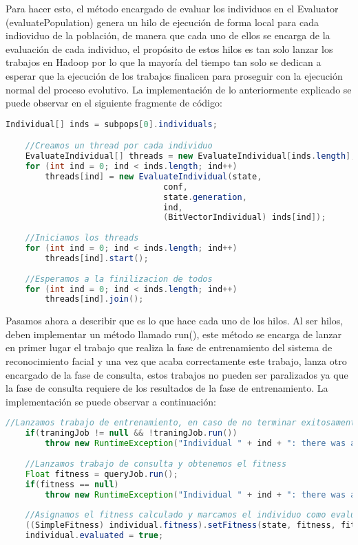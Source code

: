 Para hacer esto, el método encargado de evaluar los individuos en el Evaluator (evaluatePopulation) genera un hilo de ejecución de forma local para cada indioviduo de la poblaci\'on, de manera que cada uno de ellos se encarga de la evaluación de cada individuo, el propósito de estos hilos es tan solo lanzar los trabajos en Hadoop por lo que la mayoría del tiempo tan solo se dedican a esperar que la ejecución de los trabajos finalicen para proseguir con la ejecución normal del proceso evolutivo. La implementación de lo anteriormente explicado se puede observar en el siguiente fragmente de código:

\begin{lstlisting}[language=Java]
	Individual[] inds = subpops[0].individuals;

	//Creamos un thread por cada individuo
	EvaluateIndividual[] threads = new EvaluateIndividual[inds.length];
	for (int ind = 0; ind < inds.length; ind++)
		threads[ind] = new EvaluateIndividual(state, 
								conf, 
								state.generation, 
								ind, 
								(BitVectorIndividual) inds[ind]);
			
	//Iniciamos los threads
	for (int ind = 0; ind < inds.length; ind++)
		threads[ind].start();
			
	//Esperamos a la finilizacion de todos
	for (int ind = 0; ind < inds.length; ind++)
		threads[ind].join();
\end{lstlisting}

Pasamos ahora a describir que es lo que hace cada uno de los hilos. Al ser hilos, deben implementar un m\'etodo llamado run(), este método se encarga de lanzar en primer lugar el trabajo que realiza la fase de entrenamiento del sistema de reconocimiento facial y una vez que acaba correctamente este trabajo, lanza otro encargado de la fase de consulta, estos trabajos no pueden ser paralizados ya que la fase de consulta requiere de los resultados de la fase de entrenamiento. La implementación se puede observar a continuación:

 \begin{lstlisting}[language=Java]
 	//Lanzamos trabajo de entrenamiento, en caso de no terminar exitosamente lanzamos una excepcion
	if(traningJob != null && !traningJob.run())
		throw new RuntimeException("Individual " + ind + ": there was a problem during the training phase");
		
	//Lanzamos trabajo de consulta y obtenemos el fitness
	Float fitness = queryJob.run();
	if(fitness == null)
		throw new RuntimeException("Individual " + ind + ": there was a problem during the query phase");
			
	//Asignamos el fitness calculado y marcamos el individuo como evaluado
	((SimpleFitness) individual.fitness).setFitness(state, fitness, fitness >= 1F);
	individual.evaluated = true;	
\end{lstlisting}

